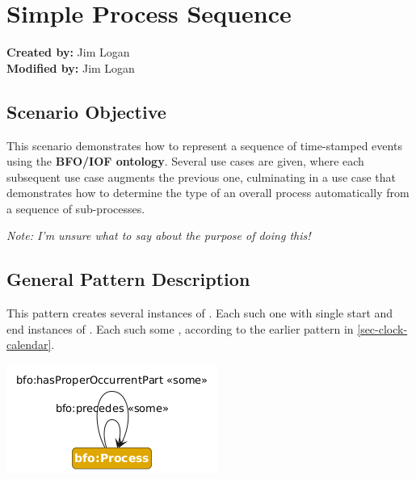 
\section{Simple Process Sequence}

\textbf{Created by:} Jim Logan \\
\textbf{Modified by:} Jim Logan \\

\subsection*{Scenario Objective}
This scenario demonstrates how to represent a sequence of time-stamped events using the \textbf{BFO/IOF ontology}. Several use cases are given, where each subsequent use case augments the previous one, culminating in a use case that demonstrates how to determine the type of an overall process automatically from a sequence of sub-processes.

\textit{ 
Note: I'm unsure what to say about the purpose of doing this!
}

\subsection*{General Pattern Description}

This pattern creates several instances of . Each such 
one
with single start and end instances of
.
Each such 
 some
, according to the earlier pattern in
\ref{sec-clock-calendar}.

\includegraphics[scale=0.5]{scenarios/simple-process-sequence/image/general-pattern.png}


